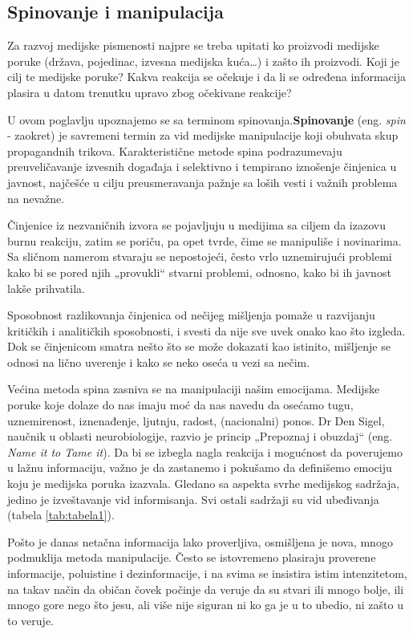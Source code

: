 \documentclass[a4paper]{article}
\begin{document}
\begin{itemize}
\section{Spinovanje i manipulacija}
\label{sec:naslovN}

Za razvoj medijske pismenosti najpre se treba upitati ko proizvodi medijske poruke (država, pojedinac, izvesna medijska kuća…) i zašto ih proizvodi. Koji je cilj te medijske poruke? Kakva reakcija se očekuje i da li se određena informacija plasira u datom trenutku upravo zbog očekivane reakcije? 

U ovom poglavlju upoznajemo se sa terminom spinovanja.\textbf{Spinovanje} (eng. \emph{spin} - zaokret) je savremeni termin za vid medijske manipulacije koji obuhvata skup propagandnih trikova. Karakteristične metode spina podrazumevaju preuveličavanje izvesnih događaja i selektivno i tempirano iznošenje činjenica u javnost, najčešće u cilju preusmeravanja pažnje sa loših vesti i važnih problema na nevažne.

Činjenice iz nezvaničnih izvora se pojavljuju u medijima sa ciljem da izazovu burnu reakciju, zatim se poriču, pa opet tvrde, čime se manipuliše i novinarima. Sa sličnom namerom stvaraju se nepostojeći, često vrlo uznemirujući problemi kako bi se pored njih „provukli“ stvarni problemi, odnosno, kako bi ih javnost lakše prihvatila. 

Sposobnost razlikovanja činjenica od nečijeg mišljenja pomaže u razvijanju kritičkih i analitičkih sposobnosti, i svesti da nije sve uvek onako kao što izgleda. Dok se činjenicom smatra nešto što se može dokazati kao istinito, mišljenje se odnosi na lično uverenje i kako se neko oseća u vezi sa nečim. 

Većina metoda spina zasniva se na manipulaciji našim emocijama. Medijske poruke koje dolaze do nas imaju moć da nas navedu da osećamo tugu, uznemirenost, iznenađenje, ljutnju, radost, (nacionalni) ponos. Dr Den Sigel, naučnik u oblasti neurobiologije, razvio je princip „Prepoznaj i obuzdaj“ \cite {nameittotameit} (eng. \emph{Name it to Tame it}). Da bi se izbegla nagla reakcija i mogućnost da poverujemo u lažnu informaciju, važno je da zastanemo i pokušamo da definišemo emociju koju je medijska poruka izazvala. Gledano sa aspekta svrhe medijskog sadržaja, jedino je izveštavanje vid informisanja. Svi ostali sadržaji su vid ubeđivanja (tabela \ref{tab:tabela1}). 

Pošto je danas netačna informacija lako proverljiva, osmišljena je nova, mnogo podmuklija metoda manipulacije. Često se istovremeno plasiraju proverene informacije, poluistine i  dezinformacije, i na svima se insistira istim intenzitetom, na takav način da običan čovek počinje da veruje da su stvari ili mnogo bolje, ili mnogo gore nego što jesu, ali više nije siguran ni ko ga je u to ubedio, ni zašto u to veruje.


\end{itemize}
\end{document}

